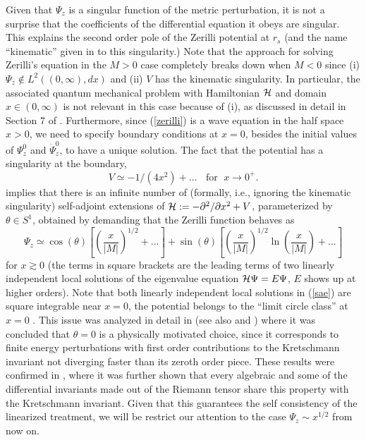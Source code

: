 \documentclass[aps,floats,showpacs,amssymb,tightenlines]{revtex4}
\def\p{\partial}
\begin{document}
Given that $\Psi_z$ is a singular function of the metric perturbation, it is not a surprise
that the coefficients of the differential equation it obeys are singular. This explains
the second order pole of the Zerilli potential at $r_s$ (and the name ``kinematic'' given in \cite{dg}
to this singularity.) Note that the approach for solving Zerilli's equation in the $M>0$ case
completely breaks down when $M<0$ since (i) $\Psi_z \not \in L^2((0,\infty),dx)$ and
(ii) $V$ has the kinematic singularity. In particular, the associated quantum mechanical problem
with Hamiltonian ${\cal H}$ and domain $x \in (0,\infty)$ is not relevant in this case because of (i),
as discussed in detail in Section 7 of \cite{dg}.
Furthermore, since (\ref{zerilli})  is a wave equation in the half space $x>0$, we need to specify boundary conditions at
 $x=0$, besides the initial values of $\Psi_z^0$ and $\dot \Psi_z^0$,  to have  a unique solution.
 The fact that the potential has a singularity at the boundary,
 \begin{equation} \label{vcero}
 V \simeq -1/(4x^2)+ ... \;\; \text{ for } \; x \to 0^+.
 \end{equation}
implies that there is an infinite number of (formally, i.e., ignoring the kinematic singularity) self-adjoint extensions
of ${\cal H} := -\p^2/\p x^2 +V$, parameterized by $\theta \in S^1$, obtained  by demanding that the Zerilli function
behaves as
\begin{equation} \label{sae}
\Psi_z \simeq \cos (\theta) \left[ \left(\frac{x}{|M|}\right)^{1/2}  + ... \right] +\sin (\theta) \left[ \left(\frac{x}{|M|}\right)^{1/2}  \ln \left(\frac{x}{|M|} \right) + ... \right]
\end{equation}
for $x \gtrsim 0$ (the terms in square brackets are the leading terms of two linearly independent local solutions
of the eigenvalue equation ${\cal H} \Psi = E \Psi$, $E$ shows up at higher orders).
Note that both linearly independent local solutions in (\ref{sae}) are square integrable near $x=0$, the potential
belongs to the ``limit circle class'' at $x=0$  \cite{reed}.
This issue was
analyzed in detail in \cite{ghi} (see also  \cite{meetz} and \cite{reed})
 where it was concluded that $\theta=0$ is a physically motivated
choice, since it corresponds to finite energy perturbations with first order contributions
to the Kretschmann invariant not diverging faster than its zeroth order piece. These results
were confirmed in \cite{dg}, where it was further shown that every algebraic and some of the differential
invariants made out of the Riemann tensor share this property with the Kretschmann invariant. Given that this guarantees
the self consistency of the linearized treatment, we will be restrict our attention to the case
$\Psi_z \sim x^{1/2}$ from now on.
\end{document}
